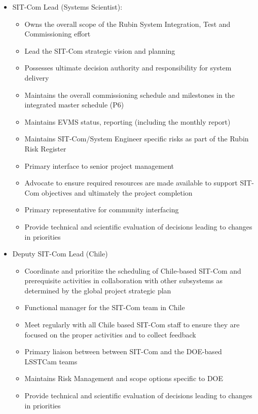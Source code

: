 \documentclass[SE,toc]{lsstdoc}
\begin{document}
\begin{itemize}
    \item SIT-Com Lead (Systems Scientist):
    \begin{itemize}
        \item Owns the overall scope of the Rubin System Integration, Test and Commissioning effort
        \item Lead the SIT-Com strategic vision and planning
        \item Possesses ultimate decision authority and responsibility for system delivery
        \item Maintains the overall commissioning schedule and milestones in the integrated master schedule (P6)
        \item Maintains EVMS status, reporting (including the monthly report)
        \item Maintains SIT-Com/System Engineer specific risks as part of the Rubin Risk Register
        \item Primary interface to senior project management
        \item Advocate to ensure required resources are made available to support SIT-Com objectives and ultimately the project completion
        \item Primary representative for community interfacing
        \item Provide technical and scientific evaluation of decisions leading to changes in priorities
    \end{itemize}
    \item Deputy SIT-Com Lead (Chile)
    \begin{itemize}
        \item Coordinate and prioritize the scheduling of Chile-based SIT-Com and prerequisite activities in collaboration with other subsystems as determined by the global project strategic plan
        \item Functional manager for the SIT-Com team in Chile
        \item Meet regularly with all Chile based SIT-Com staff to ensure they are focused on the proper activities and to collect feedback
        \item Primary liaison between between SIT-Com and the DOE-based LSSTCam teams
        \item Maintains Risk Management and scope options specific to DOE
        \item Provide technical and scientific evaluation of decisions leading to changes in priorities

\end{itemize}
\end{itemize}
\end{document}
